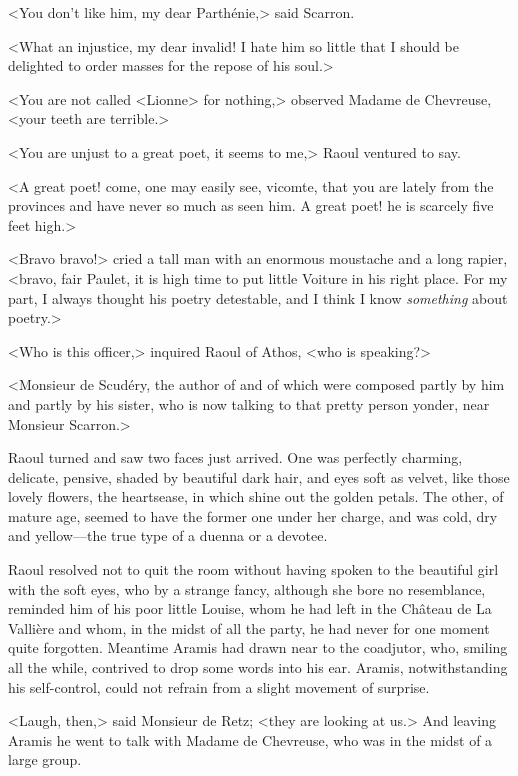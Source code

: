 <You don't like him, my dear Parthénie,> said Scarron.

<What an injustice, my dear invalid! I hate him so little that I should be delighted to order masses for the repose of his soul.>

<You are not called <Lionne> for nothing,> observed Madame de Chevreuse, <your teeth are terrible.>

<You are unjust to a great poet, it seems to me,> Raoul ventured to say.

<A great poet! come, one may easily see, vicomte, that you are lately from the provinces and have never so much as seen him. A great poet! he is scarcely five feet high.>

<Bravo bravo!> cried a tall man with an enormous moustache and a long rapier, <bravo, fair Paulet, it is high time to put little Voiture in his right place. For my part, I always thought his poetry detestable, and I think I know \emph{something} about poetry.>

<Who is this officer,> inquired Raoul of Athos, <who is speaking?>

<Monsieur de Scudéry, the author of  and of  which were composed partly by him and partly by his sister, who is now talking to that pretty person yonder, near Monsieur Scarron.>

Raoul turned and saw two faces just arrived. One was perfectly charming, delicate, pensive, shaded by beautiful dark hair, and eyes soft as velvet, like those lovely flowers, the heartsease, in which shine out the golden petals. The other, of mature age, seemed to have the former one under her charge, and was cold, dry and yellow—the true type of a duenna or a devotee.

Raoul resolved not to quit the room without having spoken to the beautiful girl with the soft eyes, who by a strange fancy, although she bore no resemblance, reminded him of his poor little Louise, whom he had left in the Château de La Vallière and whom, in the midst of all the party, he had never for one moment quite forgotten. Meantime Aramis had drawn near to the coadjutor, who, smiling all the while, contrived to drop some words into his ear. Aramis, notwithstanding his self-control, could not refrain from a slight movement of surprise.

<Laugh, then,> said Monsieur de Retz; <they are looking at us.> And leaving Aramis he went to talk with Madame de Chevreuse, who was in the midst of a large group.

